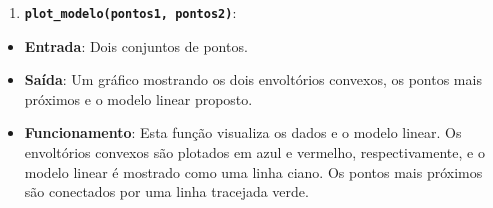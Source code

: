 \documentclass[11pt]{article}
\providecommand{\tightlist}{%
      \setlength{\itemsep}{0pt}\setlength{\parskip}{0pt}}
\begin{document}
\begin{enumerate}
\def\labelenumi{\arabic{enumi}.}
\setcounter{enumi}{2}
\tightlist
\item
  \textbf{\texttt{plot\_modelo(pontos1,\ pontos2)}}:
\end{enumerate}

\begin{itemize}
\tightlist
\item
  \textbf{Entrada}: Dois conjuntos de pontos.
\item
  \textbf{Saída}: Um gráfico mostrando os dois envoltórios convexos, os
  pontos mais próximos e o modelo linear proposto.
\item
  \textbf{Funcionamento}: Esta função visualiza os dados e o modelo
  linear. Os envoltórios convexos são plotados em azul e vermelho,
  respectivamente, e o modelo linear é mostrado como uma linha ciano. Os
  pontos mais próximos são conectados por uma linha tracejada verde.
\end{itemize}
\end{document}
